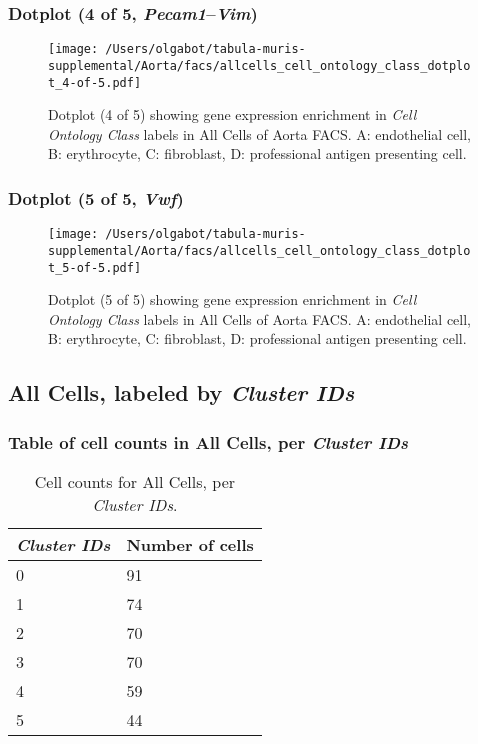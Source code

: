 \subsubsection{Dotplot (4 of 5, \emph{Pecam1}--\emph{Vim})}
\begin{figure}[h]
\centering
\texttt{[image: /Users/olgabot/tabula-muris-supplemental/Aorta/facs/allcells\_cell\_ontology\_class\_dotplot\_4-of-5.pdf]}

\caption{ Dotplot (4 of 5)  showing gene expression enrichment in \emph{Cell Ontology Class} labels in All Cells of Aorta FACS. A: endothelial cell, B: erythrocyte, C: fibroblast, D: professional antigen presenting cell.}
\end{figure}


\clearpage

\subsubsection{Dotplot (5 of 5, \emph{Vwf})}
\begin{figure}[h]
\centering
\texttt{[image: /Users/olgabot/tabula-muris-supplemental/Aorta/facs/allcells\_cell\_ontology\_class\_dotplot\_5-of-5.pdf]}

\caption{ Dotplot (5 of 5)  showing gene expression enrichment in \emph{Cell Ontology Class} labels in All Cells of Aorta FACS. A: endothelial cell, B: erythrocyte, C: fibroblast, D: professional antigen presenting cell.}
\end{figure}


\clearpage

\subsection{All Cells, labeled by \emph{Cluster IDs}}
\subsubsection{Table of cell counts in All Cells, per \emph{Cluster IDs}}\begin{table}[h]
\centering
\label{my-label}
\begin{tabular}{@{}ll@{}}
\toprule

\emph{Cluster IDs}& Number of cells \\ \midrule
0 & 91 \\

1 & 74 \\

2 & 70 \\

3 & 70 \\

4 & 59 \\

5 & 44 \\
\bottomrule
\end{tabular}
\caption{Cell counts for All Cells, per \emph{Cluster IDs}.}
\end{table}

